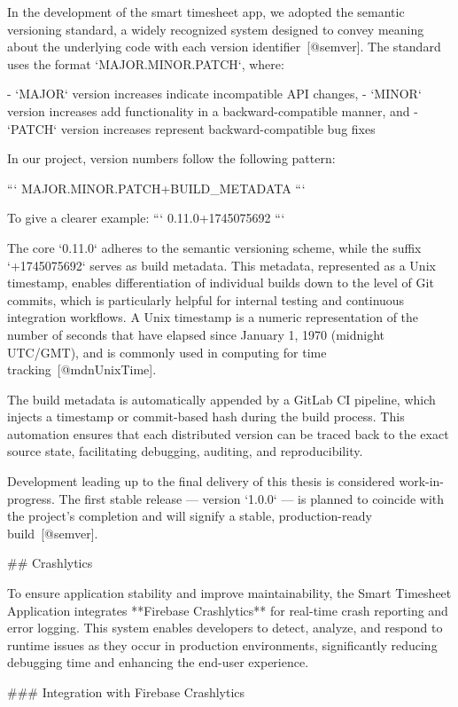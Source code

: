 \documentclass[
  digital,     %
  oneside,     %
  nosansbold,  %
  nocolorbold, %
  lof,         %
  lot,         %
]{fithesis4}
\begin{document}
\begin{markdown}
In the development of the smart timesheet app, we adopted the semantic versioning standard, a widely recognized system designed to convey meaning about the underlying code with each version identifier~[@semver]. The standard uses the format `MAJOR.MINOR.PATCH`, where:

- `MAJOR` version increases indicate incompatible API changes,
- `MINOR` version increases add functionality in a backward-compatible manner, and
- `PATCH` version increases represent backward-compatible bug fixes

In our project, version numbers follow the following pattern:

```
MAJOR.MINOR.PATCH+BUILD_METADATA
```

To give a clearer example:
```
0.11.0+1745075692
```

The core `0.11.0` adheres to the semantic versioning scheme, while the suffix `+1745075692` serves as build metadata. This metadata, represented as a Unix timestamp, enables differentiation of individual builds down to the level of Git commits, which is particularly helpful for internal testing and continuous integration workflows. A Unix timestamp is a numeric representation of the number of seconds that have elapsed since January 1, 1970 (midnight UTC/GMT), and is commonly used in computing for time tracking~[@mdnUnixTime].

The build metadata is automatically appended by a GitLab CI pipeline, which injects a timestamp or commit-based hash during the build process. This automation ensures that each distributed version can be traced back to the exact source state, facilitating debugging, auditing, and reproducibility.

Development leading up to the final delivery of this thesis is considered work-in-progress. The first stable release — version `1.0.0` — is planned to coincide with the project's completion and will signify a stable, production-ready build~[@semver].

## Crashlytics

To ensure application stability and improve maintainability, the Smart Timesheet Application integrates **Firebase Crashlytics** for real-time crash reporting and error logging. This system enables developers to detect, analyze, and respond to runtime issues as they occur in production environments, significantly reducing debugging time and enhancing the end-user experience.

### Integration with Firebase Crashlytics


\end{markdown}
\end{document}
